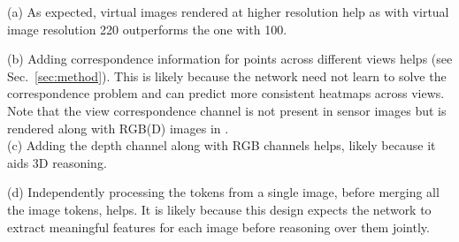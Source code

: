 (a) As expected, virtual images rendered at higher resolution help as \method with virtual image resolution 220 outperforms the one with 100.

(b) Adding correspondence information for points across different views helps (see Sec.~\ref{sec:method}). This is likely because the network need not learn to solve the correspondence problem and can predict more consistent heatmaps across views. Note that the view correspondence channel is not present in sensor images but is rendered along with RGB(D) images in \method.
\vspace{1mm}
\\
(c) Adding the depth channel along with RGB channels helps, likely because it aids 3D reasoning.

(d) Independently processing the tokens from a single image, before merging all the image tokens, helps. It is likely because this design expects the network to extract meaningful features for each image before reasoning over them jointly.
